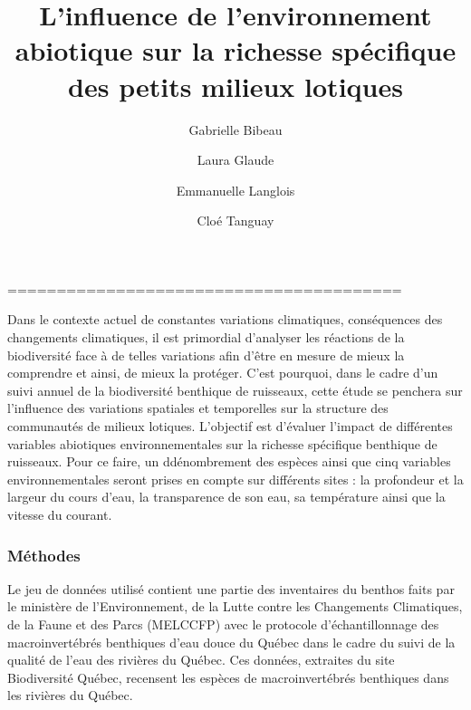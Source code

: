 \documentclass[9pt,twocolumn,twoside,]{pnas-new}
\title{L'influence de l'environnement abiotique sur la richesse
spécifique des petits milieux lotiques}
\author[a,1]{Gabrielle Bibeau}
\author[a]{Laura Glaude}
\author[a]{Emmanuelle Langlois}
\author[a]{Cloé Tanguay}
\affil[a]{Université de Sherbrooke, Département de Biologie, 2500
Boulevard de l'Université, Sherbrooke, Québec, Canada}
\begin{document}
\verticaladjustment{-2pt}



\maketitle
\thispagestyle{firststyle}



========================================

Dans le contexte actuel de constantes variations climatiques,
conséquences des changements climatiques, il est primordial d'analyser
les réactions de la biodiversité face à de telles variations afin d'être
en mesure de mieux la comprendre et ainsi, de mieux la protéger. C'est
pourquoi, dans le cadre d'un suivi annuel de la biodiversité benthique
de ruisseaux, cette étude se penchera sur l'influence des variations
spatiales et temporelles sur la structure des communautés de milieux
lotiques. L'objectif est d'évaluer l'impact de différentes variables
abiotiques environnementales sur la richesse spécifique benthique de
ruisseaux. Pour ce faire, un ddénombrement des espèces ainsi que cinq
variables environnementales seront prises en compte sur différents sites
: la profondeur et la largeur du cours d'eau, la transparence de son
eau, sa température ainsi que la vitesse du courant.

\hypertarget{muxe9thodes}{%
\subsubsection*{Méthodes}\label{muxe9thodes}}

Le jeu de données utilisé contient une partie des inventaires du benthos
faits par le ministère de l'Environnement, de la Lutte contre les
Changements Climatiques, de la Faune et des Parcs (MELCCFP) avec le
protocole d'échantillonnage des macroinvertébrés benthiques d'eau douce
du Québec dans le cadre du suivi de la qualité de l'eau des rivières du
Québec. Ces données, extraites du site Biodiversité Québec, recensent
les espèces de macroinvertébrés benthiques dans les rivières du Québec.
\end{document}
